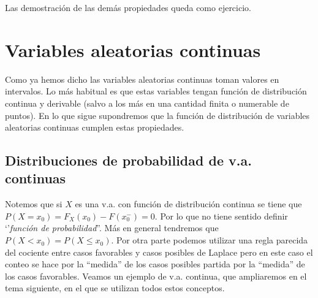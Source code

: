 \documentclass[12pt]{report}
\begin{document}
Las demostración de las demás propiedades queda como ejercicio.




\section{Variables aleatorias continuas}
    Como ya hemos dicho las variables aleatorias continuas toman valores en
    intervalos.
    Lo más habitual es que estas variables tengan función de distribución continua y
    derivable (salvo  a los más en una cantidad finita o numerable de puntos). En lo que
    sigue supondremos que la función de distribución de variables
   aleatorias continuas cumplen estas propiedades.


\subsection{Distribuciones de probabilidad de v.a. continuas}
    Notemos que si $X$ es una v.a. con función de distribución continua se tiene que
        $P(X=x_{0})=F_X(x_0)-F(x_0^{-})=0$. Por lo que no tiene sentido definir `'\textit{función de
        probabilidad}''. Más en general tendremos que $P(X<x_0)=P(X\leq x_0)$.
    Por otra parte podemos utilizar una regla parecida del
    cociente entre casos favorables y casos posibles de Laplace  pero en
    este caso el conteo se hace por la ``medida''  de los casos
    posibles partida por la ``medida'' de los casos favorables.
    Veamos un ejemplo de v.a. continua, que ampliaremos en el
    tema siguiente, en el que se utilizan todos estos conceptos.
\end{document}
